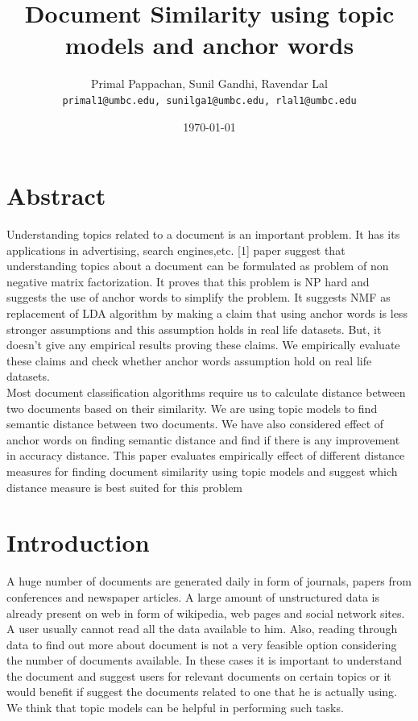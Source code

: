 \documentclass[a4paper,11pt]{article}
\begin{document}

\title{Document Similarity using topic models and anchor words}
\author{Primal Pappachan, Sunil Gandhi, Ravendar Lal \\ 
\texttt{primal1@umbc.edu, sunilga1@umbc.edu, rlal1@umbc.edu}}
\date{\today}
\maketitle



\section{Abstract}
Understanding topics related to a document is an important problem. It has its applications in advertising, search engines,etc. [1] paper suggest that understanding topics about a document can be formulated as problem of non negative matrix factorization. It proves that this problem is NP hard and suggests the use of anchor words to simplify the problem. It suggests NMF as replacement of LDA algorithm by making a claim that using anchor words is less stronger assumptions and this assumption holds in real life datasets. But, it doesn't give any empirical results proving these claims. We empirically evaluate these claims and check whether anchor words assumption hold on real life datasets. \\

Most document classification algorithms require us to calculate distance between two documents based on their similarity. We are using topic models to find semantic distance between two documents. We have also considered effect of anchor words on finding semantic distance and find if there is any improvement in accuracy distance. This paper evaluates empirically effect of different distance measures for finding document similarity using topic models and suggest which distance measure is best suited for this problem

\pagebreak

\section{Introduction}
A huge number of documents are generated daily in form of journals, papers from conferences and newspaper articles. A large amount of unstructured data is already present on web in form of wikipedia, web pages and social network sites. A user usually cannot read all the data available to him. Also, reading through data to find out more about document is not a very feasible option considering the number of documents available. In these cases it is important to understand the document and suggest users for relevant documents on certain topics or it would benefit if suggest the documents related to one that he is actually using. We think that topic models can be helpful in performing such tasks. \\
\end{document}
